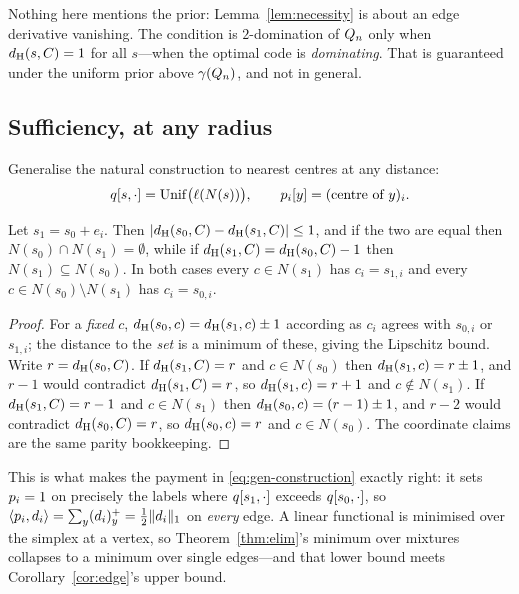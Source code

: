 Nothing here mentions the prior: Lemma~\ref{lem:necessity} is about an edge
derivative vanishing. The condition is $2$-domination of $Q_n$ only when
$d_{\mathrm{H}}(s,C) = 1$ for all $s$---when the optimal code is \emph{dominating}. That is
guaranteed under the uniform prior above $\gamma(Q_n)$, and not in general.

\subsection{Sufficiency, at any radius}

Generalise the natural construction to nearest centres at any distance:
\begin{equation}
  q[s,\cdot] = \mathrm{Unif}\bigl(\ell(N(s))\bigr),
  \qquad
  p_i[y] = (\text{centre of } y)_i .
  \label{eq:gen-construction}
\end{equation}

\begin{lemma}
\label{lem:edge-structure}
Let $s_1 = s_0 + e_i$. Then $|d_{\mathrm{H}}(s_0,C) - d_{\mathrm{H}}(s_1,C)| \le 1$, and if the two are
equal then $N(s_0) \cap N(s_1) = \emptyset$, while if
$d_{\mathrm{H}}(s_1,C) = d_{\mathrm{H}}(s_0,C) - 1$ then $N(s_1) \subseteq N(s_0)$. In both cases every
$c \in N(s_1)$ has $c_i = s_{1,i}$ and every $c \in N(s_0)\setminus N(s_1)$ has
$c_i = s_{0,i}$.
\end{lemma}

\begin{proof}
For a \emph{fixed} $c$, $d_{\mathrm{H}}(s_0,c) = d_{\mathrm{H}}(s_1,c) \pm 1$ according as $c_i$ agrees
with $s_{0,i}$ or $s_{1,i}$; the distance to the \emph{set} is a minimum of
these, giving the Lipschitz bound. Write $r = d_{\mathrm{H}}(s_0,C)$. If $d_{\mathrm{H}}(s_1,C) = r$
and $c \in N(s_0)$ then $d_{\mathrm{H}}(s_1,c) = r \pm 1$, and $r-1$ would contradict
$d_{\mathrm{H}}(s_1,C) = r$, so $d_{\mathrm{H}}(s_1,c) = r+1$ and $c \notin N(s_1)$. If
$d_{\mathrm{H}}(s_1,C) = r-1$ and $c \in N(s_1)$ then $d_{\mathrm{H}}(s_0,c) = (r-1)\pm 1$, and $r-2$
would contradict $d_{\mathrm{H}}(s_0,C) = r$, so $d_{\mathrm{H}}(s_0,c) = r$ and $c \in N(s_0)$. The
coordinate claims are the same parity bookkeeping.
\end{proof}

This is what makes the payment in \eqref{eq:gen-construction} exactly right: it
sets $p_i = 1$ on precisely the labels where $q[s_1,\cdot]$ exceeds
$q[s_0,\cdot]$, so $\langle p_i, d_i\rangle = \sum_y (d_i)^+_y =
\tfrac12\|d_i\|_1$ on \emph{every} edge. A linear functional is minimised over
the simplex at a vertex, so Theorem~\ref{thm:elim}'s minimum over mixtures
collapses to a minimum over single edges---and that lower bound meets
Corollary~\ref{cor:edge}'s upper bound.

